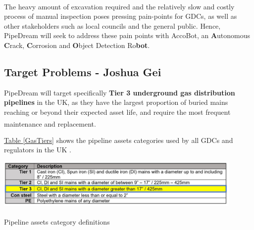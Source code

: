 \documentclass[11pt]{article}		%
\newcommand{\supercite}[1]{\textsuperscript{\cite{#1}}}		%
\newcommand{\tableref}[1]{\hyperref[#1]{Table \ref*{#1}}}     %
\begin{document}
		\vspace{-0.75cm}
		\\The heavy amount of excavation required and the relatively slow and costly process of manual inspection poses pressing pain-points for GDCs, as well as other stakeholders such as local councils and the general public. Hence, PipeDream will seek to address these pain points with AccoBot, an \textbf{A}utonomous \textbf{C}rack, \textbf{C}orrosion and \textbf{O}bject Detection Ro\textbf{bot}.
		
	\subsection[Target Problems]{Target Problems - Joshua Gei}
	
	PipeDream will target specifically \textbf{Tier 3 underground gas distribution pipelines} in the UK, as they have the largest proportion of buried mains reaching or beyond their expected asset life, and require the most frequent maintenance and replacement\supercite{tier3}.
	
	\tableref{GasTiers} shows the pipeline assets categories used by all GDCs and regulators in the UK .
		\begin{table}[h]
			\centering
			\includegraphics[width=0.9\textwidth]{GasTiers}
			\caption{Pipeline assets category definitions\supercite{tier3}}
			\label{GasTiers}
 		\end{table}
 	
\end{document}
